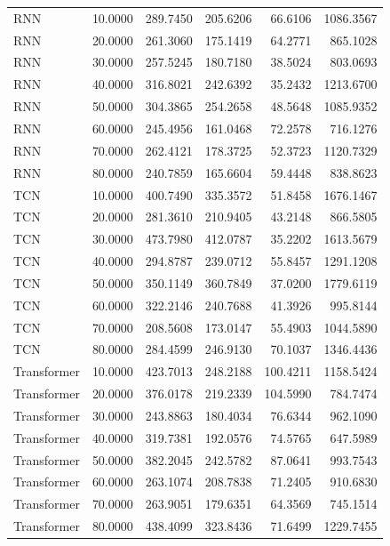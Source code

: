 \begin{tabular}{lrrrrr}
RNN & 10.0000 & 289.7450 & 205.6206 & 66.6106 & 1086.3567 \\
RNN & 20.0000 & 261.3060 & 175.1419 & 64.2771 & 865.1028 \\
RNN & 30.0000 & 257.5245 & 180.7180 & 38.5024 & 803.0693 \\
RNN & 40.0000 & 316.8021 & 242.6392 & 35.2432 & 1213.6700 \\
RNN & 50.0000 & 304.3865 & 254.2658 & 48.5648 & 1085.9352 \\
RNN & 60.0000 & 245.4956 & 161.0468 & 72.2578 & 716.1276 \\
RNN & 70.0000 & 262.4121 & 178.3725 & 52.3723 & 1120.7329 \\
RNN & 80.0000 & 240.7859 & 165.6604 & 59.4448 & 838.8623 \\
TCN & 10.0000 & 400.7490 & 335.3572 & 51.8458 & 1676.1467 \\
TCN & 20.0000 & 281.3610 & 210.9405 & 43.2148 & 866.5805 \\
TCN & 30.0000 & 473.7980 & 412.0787 & 35.2202 & 1613.5679 \\
TCN & 40.0000 & 294.8787 & 239.0712 & 55.8457 & 1291.1208 \\
TCN & 50.0000 & 350.1149 & 360.7849 & 37.0200 & 1779.6119 \\
TCN & 60.0000 & 322.2146 & 240.7688 & 41.3926 & 995.8144 \\
TCN & 70.0000 & 208.5608 & 173.0147 & 55.4903 & 1044.5890 \\
TCN & 80.0000 & 284.4599 & 246.9130 & 70.1037 & 1346.4436 \\
Transformer & 10.0000 & 423.7013 & 248.2188 & 100.4211 & 1158.5424 \\
Transformer & 20.0000 & 376.0178 & 219.2339 & 104.5990 & 784.7474 \\
Transformer & 30.0000 & 243.8863 & 180.4034 & 76.6344 & 962.1090 \\
Transformer & 40.0000 & 319.7381 & 192.0576 & 74.5765 & 647.5989 \\
Transformer & 50.0000 & 382.2045 & 242.5782 & 87.0641 & 993.7543 \\
Transformer & 60.0000 & 263.1074 & 208.7838 & 71.2405 & 910.6830 \\
Transformer & 70.0000 & 263.9051 & 179.6351 & 64.3569 & 745.1514 \\
Transformer & 80.0000 & 438.4099 & 323.8436 & 71.6499 & 1229.7455 \\
\bottomrule
\end{tabular}
